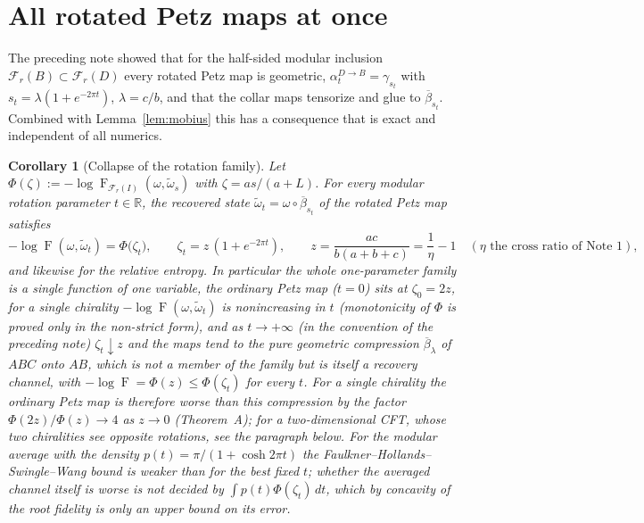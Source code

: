 \documentclass[11pt]{article}
\theoremstyle{accent}
\newtheorem{corollary}[theorem]{Corollary}
\theoremstyle{definition}
\newcommand{\cF}{\mathcal{F}}
\newcommand{\Fid}{\operatorname{F}}
\begin{document}
\section{All rotated Petz maps at once}\label{sec:rotated}

The preceding note showed that for the half-sided modular inclusion \(\cF_r(B)\subset\cF_r(D)\) every rotated Petz map is geometric, \(\alpha_t^{D\to B}=\gamma_{s_t}\) with \(s_t=\lambda(1+e^{-2\pi t})\), \(\lambda=c/b\), and that the collar maps tensorize and glue to \(\overline\beta_{s_t}\).  Combined with Lemma~\ref{lem:mobius} this has a consequence that is exact and independent of all numerics.

\begin{corollary}[Collapse of the rotation family]\label{cor:collapse}
Let \(\Phi(\zeta):=-\log\Fid_{\cF_r(I)}(\omega,\widetilde\omega_s)\) with \(\zeta=as/(a+L)\).  For every modular rotation parameter \(t\in\mathbb R\), the recovered state \(\widetilde\omega_t=\omega\circ\overline\beta_{s_t}\) of the rotated Petz map satisfies
\begin{equation}\label{eq:collapse}
 -\log\Fid(\omega,\widetilde\omega_t)=\Phi\bigl(\zeta_t\bigr),\qquad
 \zeta_t=z\,(1+e^{-2\pi t}),\qquad z=\frac{ac}{b(a+b+c)}=\frac{1}{\eta}-1\quad(\eta\text{ the cross ratio of Note~1}),
\end{equation}
and likewise for the relative entropy.  In particular the whole one-parameter family is a single function of one variable, the ordinary Petz map (\(t=0\)) sits at \(\zeta_0=2z\), for a single chirality \(-\log\Fid(\omega,\widetilde\omega_t)\) is nonincreasing in \(t\) (monotonicity of \(\Phi\) is proved only in the non-strict form), and as \(t\to+\infty\) (in the convention of the preceding note) \(\zeta_t\downarrow z\) and the maps tend to the pure geometric compression \(\overline\beta_\lambda\) of \(ABC\) onto \(AB\), which is not a member of the family but is itself a recovery channel, with \(-\log\Fid=\Phi(z)\le\Phi(\zeta_t)\) for every \(t\).  For a single chirality the ordinary Petz map is therefore worse than this compression by the factor \(\Phi(2z)/\Phi(z)\to4\) as \(z\to0\) (Theorem~A); for a two-dimensional CFT, whose two chiralities see opposite rotations, see the paragraph below.  For the modular average with the density \(p(t)=\pi/(1+\cosh2\pi t)\) the Faulkner--Hollands--Swingle--Wang bound is weaker than for the best fixed \(t\); whether the averaged channel itself is worse is not decided by \(\int p(t)\Phi(\zeta_t)\,dt\), which by concavity of the root fidelity is only an upper bound on its error.
\end{corollary}
\end{document}
